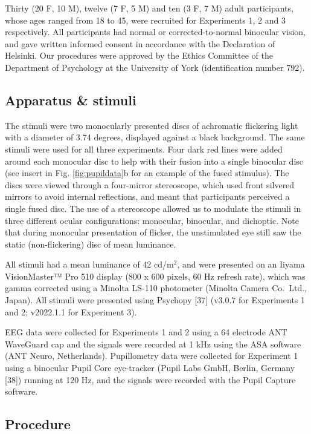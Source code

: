 \documentclass[
]{article}
\begin{document}
Thirty (20 F, 10 M), twelve (7 F, 5 M) and ten (3 F, 7 M) adult participants, whose ages ranged from 18 to 45, were recruited for Experiments 1, 2 and 3 respectively. All participants had normal or corrected-to-normal binocular vision, and gave written informed consent in accordance with the Declaration of Helsinki. Our procedures were approved by the Ethics Committee of the Department of Psychology at the University of York (identification number 792).

\hypertarget{apparatus-stimuli}{%
\subsection{Apparatus \& stimuli}\label{apparatus-stimuli}}

The stimuli were two monocularly presented discs of achromatic flickering light with a diameter of 3.74 degrees, displayed against a black background. The same stimuli were used for all three experiments. Four dark red lines were added around each monocular disc to help with their fusion into a single binocular disc (see insert in Fig. \ref{fig:pupildata}b for an example of the fused stimulus). The discs were viewed through a four-mirror stereoscope, which used front silvered mirrors to avoid internal reflections, and meant that participants perceived a single fused disc. The use of a stereoscope allowed us to modulate the stimuli in three different ocular configurations: monocular, binocular, and dichoptic. Note that during monocular presentation of flicker, the unstimulated eye still saw the static (non-flickering) disc of mean luminance.

All stimuli had a mean luminance of 42 cd/m\(^2\), and were presented on an Iiyama VisionMaster™ Pro 510 display (800 x 600 pixels, 60 Hz refresh rate), which was gamma corrected using a Minolta LS-110 photometer (Minolta Camera Co.~Ltd., Japan). All stimuli were presented using Psychopy {[}37{]} (v3.0.7 for Experiments 1 and 2; v2022.1.1 for Experiment 3).

EEG data were collected for Experiments 1 and 2 using a 64 electrode ANT WaveGuard cap and the signals were recorded at 1 kHz using the ASA software (ANT Neuro, Netherlands). Pupillometry data were collected for Experiment 1 using a binocular Pupil Core eye-tracker (Pupil Labs GmbH, Berlin, Germany {[}38{]}) running at 120 Hz, and the signals were recorded with the Pupil Capture software.

\hypertarget{procedure}{%
\subsection{Procedure}\label{procedure}}
\end{document}
